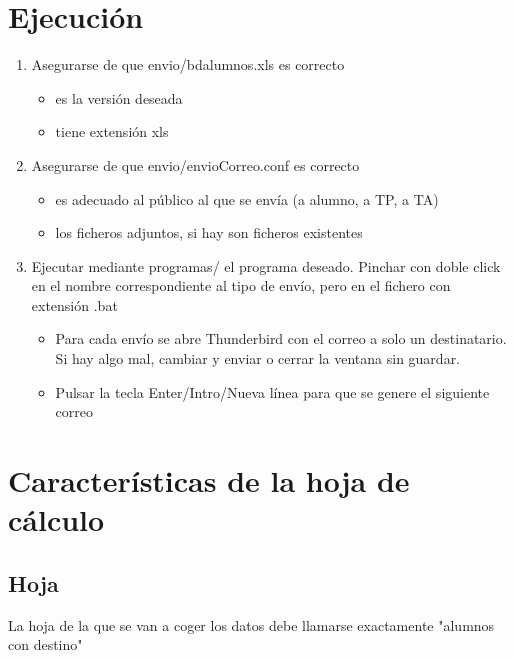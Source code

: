 \documentclass[11pt]{article}
\begin{document}
\section{Ejecución}
\label{sec-2}
\begin{enumerate}
\item Asegurarse de que envio/bdalumnos.xls es correcto
\begin{itemize}
\item es la versión deseada
\item tiene extensión xls
\end{itemize}
\item Asegurarse de que envio/envioCorreo.conf es correcto
\begin{itemize}
\item es adecuado al público al que se envía (a alumno, a TP, a TA)
\item los ficheros adjuntos, si hay son ficheros existentes
\end{itemize}
\item Ejecutar mediante programas/ el programa deseado. Pinchar con doble click en el nombre correspondiente al tipo de envío, pero en el fichero con extensión .bat
\begin{itemize}
\item Para cada envío se abre Thunderbird con el correo a solo un destinatario. Si hay algo mal, cambiar y enviar o cerrar la ventana sin guardar.
\item Pulsar la tecla Enter/Intro/Nueva línea para que se genere el siguiente correo
\end{itemize}
\end{enumerate}

\section{Características de la hoja de cálculo}
\label{sec-3}
\subsection{Hoja}
\label{sec-3-1}
La hoja de la que se van a coger los datos debe llamarse exactamente "alumnos con destino"
\end{document}
